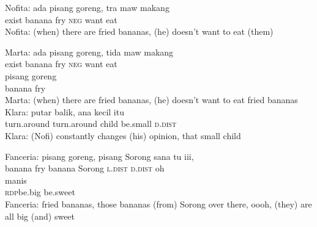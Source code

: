 \ea
\gll   Nofita:   ada   pisang   goreng,   tra   maw   makang\\
{}  exist   banana   fry   \textsc{neg}   want   eat\\
\glt
Nofita: (when) there are fried bananas, (he) doesn’t want to eat (them)
\z

\ea
\gll   Marta:   ada   pisang   goreng,   tida   maw   makang\\
 {} exist   banana   fry   \textsc{neg}   want   eat\\
\gll pisang    {goreng}\\
  banana    {fry}\\
\glt
Marta: (when) there are fried bananas, (he) doesn’t want to eat fried bananas
\z
\ea
\gll   Klara:   putar   balik,   ana   kecil   itu\\
{}  turn.around   turn.around   child   be.small   \textsc{d.dist}\\
\glt
Klara: (Nofi) constantly changes (his) opinion, that small child
\z

\ea
\gll   Fanceria:    {pisang}   goreng,   pisang   Sorong   sana   tu   iii,\\
  {} {banana}   fry   banana   Sorong   \textsc{l.dist}   \textsc{d.dist}   oh\\
    {manis}\\
   {\textsc{rdp}{\Tilde}be.big}    {be.sweet}\\
\glt
Fanceria: fried bananas, those bananas (from) Sorong over there, oooh, (they) are all big (and) sweet
\z %

